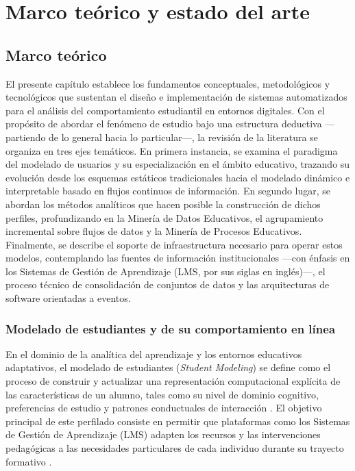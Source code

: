 \chapter{Marco teórico y estado del arte}

\section{Marco teórico}

El presente capítulo establece los fundamentos conceptuales, metodológicos y tecnológicos que sustentan el diseño e implementación de sistemas automatizados para el análisis del comportamiento estudiantil en entornos digitales. Con el propósito de abordar el fenómeno de estudio bajo una estructura deductiva —partiendo de lo general hacia lo particular—, la revisión de la literatura se organiza en tres ejes temáticos. En primera instancia, se examina el paradigma del modelado de usuarios y su especialización en el ámbito educativo, trazando su evolución desde los esquemas estáticos tradicionales hacia el modelado dinámico e interpretable basado en flujos continuos de información. En segundo lugar, se abordan los métodos analíticos que hacen posible la construcción de dichos perfiles, profundizando en la Minería de Datos Educativos, el agrupamiento incremental sobre flujos de datos y la Minería de Procesos Educativos. Finalmente, se describe el soporte de infraestructura necesario para operar estos modelos, contemplando las fuentes de información institucionales —con énfasis en los Sistemas de Gestión de Aprendizaje (LMS, por sus siglas en inglés)—, el proceso técnico de consolidación de conjuntos de datos y las arquitecturas de software orientadas a eventos.

\subsection{Modelado de estudiantes y de su comportamiento en línea}

En el dominio de la analítica del aprendizaje y los entornos educativos adaptativos, el modelado de estudiantes (\textit{Student Modeling}) se define como el proceso de construir y actualizar una representación computacional explícita de las características de un alumno, tales como su nivel de dominio cognitivo, preferencias de estudio y patrones conductuales de interacción \cite{Brusilovsky2007, Chrysafiadi2013}. El objetivo principal de este perfilado consiste en permitir que plataformas como los Sistemas de Gestión de Aprendizaje (LMS) adapten los recursos y las intervenciones pedagógicas a las necesidades particulares de cada individuo durante su trayecto formativo \cite{Fischer2001, Chrysafiadi2013}.

